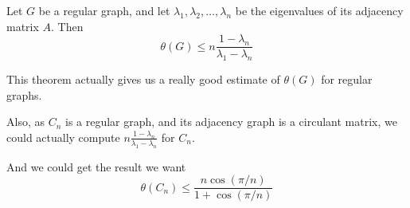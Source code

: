 \documentclass{beamer}
\begin{document}
                  \begin{frame}
                        \begin{theorem}
                              Let $G$ be a regular graph, and let $\lambda_{1},\lambda_{2},\dots,\lambda_{n}$ be the eigenvalues of its adjacency matrix $A$. Then
                              \begin{equation}
                                    \theta(G) \le n\frac{1-\lambda_{n}}{\lambda_{1}-\lambda_{n}}
                              \end{equation}
                        \end{theorem}

                        This theorem actually gives us a really good estimate of $\theta(G)$ for regular graphs.

                        \pause

                        Also, as $C_{n}$ is a regular graph, and its adjacency graph is a circulant matrix, we could actually compute \begin{math}
                              n\frac{1-\lambda_{n}}{\lambda_{1}-\lambda_{n}}
                        \end{math} for $C_{n}$.

                        And we could get the result we want 
                        \begin{equation}
                              \theta(C_{n}) \le \frac{
                                    n \cos(\pi/n)
                              }{
                                    1+\cos(\pi/n)
                              }
                        \end{equation}
                  \end{frame}
\end{document}
